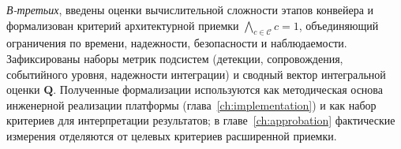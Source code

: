 \textit{В-третьих}, введены оценки вычислительной сложности этапов конвейера и формализован критерий архитектурной приемки $\bigwedge_{c \in \mathcal{C}} c = 1$, объединяющий ограничения по времени, надежности, безопасности и наблюдаемости. Зафиксированы наборы метрик подсистем (детекции, сопровождения, событийного уровня, надежности интеграции) и сводный вектор интегральной оценки $\mathbf{Q}$. Полученные формализации используются как методическая основа инженерной реализации платформы (глава~\ref{ch:implementation}) и как набор критериев для интерпретации результатов; в главе~\ref{ch:approbation} фактические измерения отделяются от целевых критериев расширенной приемки.
